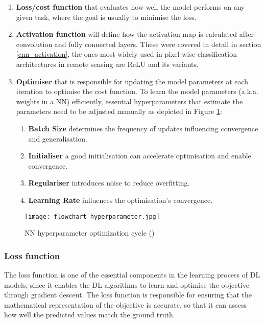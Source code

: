 \begin{enumerate}
    \item \textbf{Loss/cost function} that evaluates how well the model performs on any given task, where the goal is usually to minimise the loss.
    \item \textbf{Activation function} will define how the activation map is calculated after convolution and fully connected layers. These were covered in detail in section \ref{cnn_activation}, the ones most widely used in pixel-wise classification architectures in remote sensing are \gls{ReLU} and its variants.
    \item \textbf{Optimiser} that is responsible for updating the model parameters at each iteration to optimise the cost function. To learn the model parameters (\gls{a.k.a.} weights in a \gls{NN}) efficiently, essential hyperparameters that estimate the parameters need to be adjusted manually as depicted in Figure \ref{fig_hyperparameter}:
        \begin{enumerate}
            \item \textbf{Batch Size} determines the frequency of updates influencing convergence and generalisation.
            \item \textbf{Initialiser} a good initialisation can accelerate optimisation and enable convergence.
            \item \textbf{Regulariser} introduces noise to reduce overfitting.
            \item \textbf{Learning Rate} influences the optimisation’s convergence.
        \end{enumerate}
        
\end{enumerate}

    \begin{figure}[hbt!]
        \centering
        \texttt{[image: flowchart\_hyperparameter.jpg]}
        \caption{NN hyperparameter optimization cycle (\cite{hyperparameter_fig})}
        \label{fig_hyperparameter}
    \end{figure}
\subsubsection{Loss function} \label{loss_functions}
The loss function is one of the essential components in the learning process of \gls{DL} models, since it enables the \gls{DL} algorithms to learn and optimise the objective through gradient descent. The loss function is responsible for ensuring that the mathematical representation of the objective is accurate, so that it can assess how well the predicted values match the ground truth.

